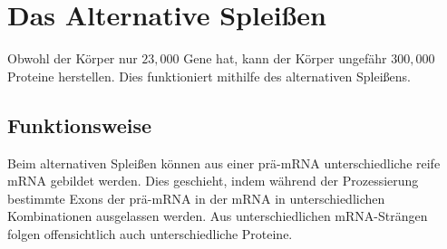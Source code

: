 \documentclass{article}
\begin{document}
\section{Das Alternative Spleißen}
Obwohl der Körper nur $23,000$ Gene hat, kann der Körper ungefähr $300,000$ Proteine herstellen. Dies funktioniert mithilfe des alternativen Spleißens.
 
\subsection{Funktionsweise}
Beim alternativen Spleißen können aus einer prä-mRNA unterschiedliche reife mRNA gebildet werden. Dies geschieht, indem während der Prozessierung bestimmte Exons der prä-mRNA in der mRNA in unterschiedlichen Kombinationen ausgelassen werden. Aus unterschiedlichen mRNA-Strängen folgen offensichtlich auch unterschiedliche Proteine.
 
\end{document}
